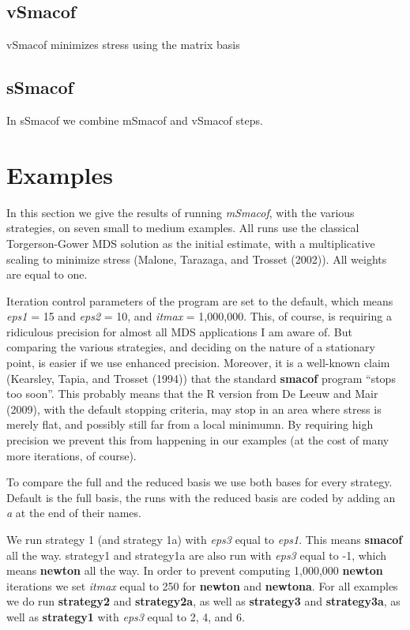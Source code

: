 \documentclass[
  12pt,
]{article}
\begin{document}
\subsection{vSmacof}\label{vsmacof}

vSmacof minimizes stress using the matrix basis

\subsection{sSmacof}\label{ssmacof}

In sSmacof we combine mSmacof and vSmacof steps.

\section{Examples}\label{examples}

In this section we give the results of running \emph{mSmacof}, with the various
strategies, on seven small to medium examples. All runs use the classical Torgerson-Gower MDS solution as the initial estimate, with a multiplicative scaling to minimize stress (Malone, Tarazaga, and Trosset (2002)). All weights are equal to one.

Iteration control parameters of the program
are set to the default, which means \emph{eps1} = 15 and \emph{eps2} = 10, and \emph{itmax}
= 1,000,000. This, of course, is requiring a ridiculous precision for almost all MDS applications I am aware of. But comparing the various strategies, and deciding on the nature of a stationary point, is easier if we use enhanced precision. Moreover, it is a well-known claim (Kearsley, Tapia, and Trosset (1994)) that the standard \textbf{smacof} program ``stops too soon''. This probably means that the R version from De Leeuw and Mair (2009), with the default stopping criteria, may stop in an area where stress is
merely flat, and possibly still far from a local minimumn.
By requiring high precision we prevent this from happening in our examples (at the cost of many more iterations, of course).

To compare the full and the reduced basis we use both bases for every strategy.
Default is the full basis, the runs with the reduced basis are coded
by adding an \emph{a} at the end of their names.

We run strategy 1 (and strategy 1a) with \emph{eps3} equal to \emph{eps1}. This means \textbf{smacof} all the way. strategy1 and strategy1a are also run with \emph{eps3} equal to -1, which
means \textbf{newton} all the way. In order to prevent computing 1,000,000 \textbf{newton} iterations we set
\emph{itmax} equal to 250 for \textbf{newton} and \textbf{newtona}.
For all examples we do run \textbf{strategy2} and \textbf{strategy2a}, as well as \textbf{strategy3} and \textbf{strategy3a}, as well as \textbf{strategy1} with \emph{eps3} equal to 2, 4, and 6.
\end{document}
